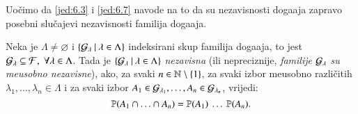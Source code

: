 Uo\v cimo da \eqref{jed:6.3} i \eqref{jed:6.7} navode na to da su nezavisnosti doga\dj aja zapravo posebni slu\v cajevi nezavisnosti familija doga\dj aja.

\begin{defn}    \label{defn:6.8}
    Neka je $\Lambda \neq \varnothing$ i $\{{\mathcal{G}_\lambda} \: | \: {\lambda \in \Lambda}\}$ indeksirani skup familija doga\dj aja, to jest $\mathcal{G}_\lambda \subseteq \mathcal{F}, \; \forall \lambda \in \Lambda$.
    Tada je $\{{\mathcal{G}_\lambda} \: | \: {\lambda \in \Lambda}\}$ \emph{nezavisna} (ili nepreciznije, \emph{familije} $\mathcal{G}_\lambda$ \emph{su me\dj usobno nezavisne}), ako, za svaki $n \in \mathbb{N} \setminus \{1\}$, za svaki izbor me\dj usobno razli\v citih $\lambda_1, \ldots, \lambda_n \in \Lambda$ i za svaki izbor $A_1 \in \mathcal{G}_{\lambda_1}, \ldots, A_n \in \mathcal{G}_{\lambda_n}$, vrijedi:
    \begin{equation*}
        \mathbb{P}({A_1 \cap \ldots \cap A_n}) = \mathbb{P}({A_1}) \: \ldots \: \mathbb{P}({A_n}).
    \end{equation*}
\end{defn}


